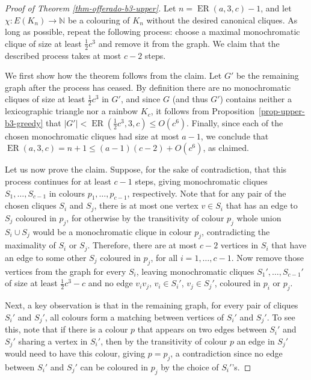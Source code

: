 \documentclass[10pt,a4paper]{article}
\theoremstyle{plain}
\theoremstyle{definition}
\newcommand{\N}{\mathbb{N}}
\newcommand{\offerado}[3]{\operatorname{ER}(#1,#2,#3)}
\begin{document}
\begin{proof}[Proof of Theorem \ref{thm-offerado-b3-upper}]\sloppy
    Let $n=\offerado{a}{3}{c}-1$, and let $\chi:E(K_n)\to\N$ be a colouring of $K_n$ without the desired canonical cliques. As long as possible, repeat the following process: choose a maximal monochromatic clique of size at least $\frac{1}{2}c^3$ and remove it from the graph. We claim that the described process takes at most $c-2$ steps.

    We first show how the theorem follows from the claim. Let $G'$ be the remaining graph after the process has ceased. By definition there are no monochromatic cliques of size at least $\frac{1}{2}c^3$ in $G'$, and since $G$ (and thus $G'$) contains neither a lexicographic triangle nor a rainbow $K_c$, it follows from Proposition~\ref{prop-upper-b3-greedy} that $|G'|<\offerado{\frac{1}{2}c^3}{3}{c}\le O(c^6)$. Finally, since each of the chosen monochromatic cliques had size at most $a-1$, we conclude that $\offerado{a}{3}{c}=n+1\le (a-1)(c-2)+O(c^6)$, as claimed.

    Let us now prove the claim. Suppose, for the sake of contradiction, that this process continues for at least $c-1$ steps, giving monochromatic cliques $S_1,\dots,S_{c-1}$ in colours $p_1,\dots,p_{c-1}$, respectively. Note that for any pair of the chosen cliques $S_i$ and $S_j$, there is at most one vertex $v\in S_i$ that has an edge to $S_j$ coloured in $p_j$, for otherwise by the transitivity of colour $p_j$ whole union $S_i\cup S_j$ would be a monochromatic clique in colour $p_j$, contradicting the maximality of $S_i$ or $S_j$. Therefore, there are at most $c-2$ vertices in $S_i$ that have an edge to some other $S_j$ coloured in $p_j$, for all $i=1,\dots,c-1$. Now remove those vertices from the graph for every $S_i$, leaving monochromatic cliques $S_1',\dots,S_{c-1}'$ of size at least $\frac{1}{2}c^3-c$ and no edge $v_iv_j$, $v_i\in S_i'$, $v_j\in S_j'$, coloured in $p_i$ or $p_j$.

    Next, a key observation is that in the remaining graph, for every pair of cliques $S_i'$ and $S_j'$, all colours form a matching between vertices of $S_i'$ and $S_j'$. To see this, note that if there is a colour $p$ that appears on two edges between $S_i'$ and $S_j'$ sharing a vertex in $S_i'$, then by the transitivity of colour $p$ an edge in $S_j'$ would need to have this colour, giving $p=p_j$, a contradiction since no edge between $S_i'$ and $S_j'$ can be coloured in $p_j$ by the choice of $S_i'$'s.
    

\end{proof}
\end{document}
